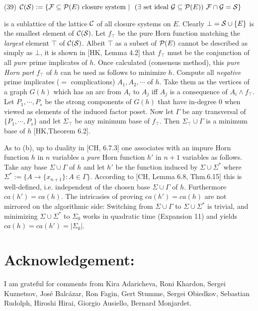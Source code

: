 \documentclass[11pt]{article}
\newcommand{\ra}{\rightarrow}
\begin{document}
(39) \quad ${\cal C}({\cal S}): = \{{\cal F} \subseteq {\cal P}(E) \ \mbox{closure system}\ | \ \ (\exists \ \mbox{set ideal} \ {\cal G} \subseteq {\cal P}(E))\ {\cal F} \cap {\cal G} = {\cal S} \}$

is a sublattice of the lattice ${\cal C}$ of all closure systems on $E$. Clearly $\bot = {\cal S} \cup \{E\}$ is the smallest element of ${\cal C}({\cal S})$. Let $f_\top$ be the pure Horn function matching the {\it largest} element $\top$ of ${\cal C}({\cal S})$. Albeit $\top$ as a subset of ${\cal P}(E)$ cannot be described as simply as $\bot$, it is shown in [HK, Lemma 4.2] that $f_\top$ must be the conjunction of all {\it pure} prime implicates of $h$. Once calculated (consensus method), this {\it pure Horn part} $f_\top$ of $h$ can be used as follows to minimize $h$. Compute all {\it negative} prime implicates ($=$ complications) $A_1, A_2, \cdots$ of $h$. Take them as the vertices of a graph $G(h)$ which has an arc from $A_i$ to $A_j$ iff $A_j$ is a consequence of $A_i \wedge f_\top$. Let $P_1, \cdots, P_s$ be the strong components of $G(h)$ that have in-degree $0$ when viewed as elements of the induced factor poset. Now let $\Gamma$ be any transversal of $\{P_1, \cdots, P_s\}$ and let $\Sigma_\top$ be any minimum base of $f_\top$. Then $\Sigma_\top \cup \Gamma$ is a minimum base of $h$ [HK,Theorem 6.2]. 

As to (b), up to duality in [CH, 6.7.3] one associates with an impure Horn function $h$ in $n$ variables a {\it pure} Horn function $h'$ in $n+1$ variables as follows. Take any base $\Sigma \cup \Gamma$ of $h$ and let $h'$ be the function induced by $\Sigma \cup \Sigma^\ast$ where $\Sigma^\ast := \{A \ra \{x_{n+1} \}: A \in \Gamma \}$. According to [CH, Lemma 6.8, Thm.6.15] this is well-defined, i.e. independent of the chosen base $\Sigma \cup \Gamma$ of $h$. Furthermore $ca(h') = ca (h)$. The intricasies of proving $ca(h') =ca(h)$ are not mirrored on the algorithmic side: Switching from $\Sigma \cup \Gamma$ to $\Sigma \cup \Sigma^\ast$ is trivial, and minimizing $\Sigma \cup \Sigma^\ast$ to $\Sigma_0$ works in quadratic time (Expansion 11) and yields $ca(h) = ca(h') = |\Sigma_0|$.



 
 
 
 
\section*{Acknowledgement:} I am grateful for comments from  Kira Adaricheva, Roni Khardon, Sergei Kuznetsov, Jos\'{e} Balc\'{a}zar, Ron Fagin,  Gert Stumme,  Sergei Obiedkov, Sebastian Rudolph, Hiroshi Hirai, Giorgio Ausiello, Bernard Monjardet.
\end{document}
